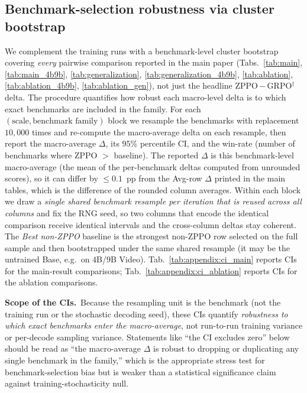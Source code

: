 \subsection{Benchmark-selection robustness via cluster bootstrap}
\label{sec:appendix:stat_reliability}

We complement the training runs with a benchmark-level cluster bootstrap covering \emph{every} pairwise comparison reported in the main paper (Tabs.~\ref{tab:main}, \ref{tab:main_4b9b}, \ref{tab:generalization}, \ref{tab:generalization_4b9b}, \ref{tab:ablation}, \ref{tab:ablation_4b9b}, \ref{tab:ablation_gen}), not just the headline ZPPO\,$-$\,GRPO$^{\dagger}$ delta. The procedure quantifies how robust each macro-level delta is to which exact benchmarks are included in the family. For each $(\text{scale}, \text{benchmark family})$ block we resample the benchmarks with replacement $10{,}000$ times and re-compute the macro-average delta on each resample, then report the macro-average $\Delta$, its $95\%$ percentile CI, and the win-rate (number of benchmarks where ZPPO $>$ baseline). The reported $\Delta$ is this benchmark-level macro-average (the mean of the per-benchmark deltas computed from unrounded scores), so it can differ by ${\le}0.1$~pp from the Avg-row $\Delta$ printed in the main tables, which is the difference of the rounded column averages. Within each block we draw a \emph{single shared benchmark resample per iteration that is reused across all columns} and fix the RNG seed, so two columns that encode the identical comparison receive identical intervals and the cross-column deltas stay coherent. The \emph{Best non-ZPPO} baseline is the strongest non-ZPPO row selected on the full sample and then bootstrapped under the same shared resample (it may be the untrained Base, e.g.\ on $4$B/$9$B Video). Tab.~\ref{tab:appendix:ci_main} reports CIs for the main-result comparisons; Tab.~\ref{tab:appendix:ci_ablation} reports CIs for the ablation comparisons.

\textbf{Scope of the CIs.}~Because the resampling unit is the benchmark (not the training run or the stochastic decoding seed), these CIs quantify \emph{robustness to which exact benchmarks enter the macro-average}, not run-to-run training variance or per-decode sampling variance. Statements like ``the CI excludes zero'' below should be read as ``the macro-average $\Delta$ is robust to dropping or duplicating any single benchmark in the family,'' which is the appropriate stress test for benchmark-selection bias but is weaker than a statistical significance claim against training-stochasticity null.

